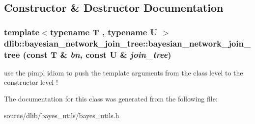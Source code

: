 \subsection{Constructor \& Destructor Documentation}
\hypertarget{classdlib_1_1bayesian__network__join__tree_a7667669c480712d31dcb0ee332491a63}{
\subsubsection[{bayesian\_\-network\_\-join\_\-tree}]{\setlength{\rightskip}{0pt plus 5cm}template$<$typename T , typename U $>$ dlib::bayesian\_\-network\_\-join\_\-tree::bayesian\_\-network\_\-join\_\-tree (const T \& {\em bn}, \/  const U \& {\em join\_\-tree})}}
\label{classdlib_1_1bayesian__network__join__tree_a7667669c480712d31dcb0ee332491a63}
use the pimpl idiom to push the template arguments from the class level to the constructor level ! 

The documentation for this class was generated from the following file:\begin{DoxyCompactItemize}
\item 
source/dlib/bayes\_\-utils/bayes\_\-utils.h\end{DoxyCompactItemize}
